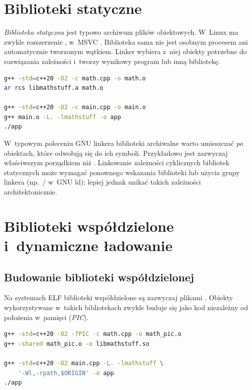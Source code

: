 \section{Biblioteki statyczne}
\label{sec:cpp17-static-libraries}

\emph{Biblioteka statyczna} jest typowo archiwum plików obiektowych.
W~Linux ma zwykle rozszerzenie , w~MSVC .
Biblioteka sama nie jest osobnym procesem ani automatycznie tworzonym
wątkiem. Linker wybiera z~niej obiekty potrzebne do rozwiązania
zależności i~tworzy wynikowy program lub inną bibliotekę.

\begin{lstlisting}[language=bash,caption={Budowanie i uzycie biblioteki statycznej (Linux/GCC).}]
g++ -std=c++20 -O2 -c math.cpp -o math.o
ar rcs libmathstuff.a math.o

g++ -std=c++20 -O2 -c main.cpp -o main.o
g++ main.o -L. -lmathstuff -o app
./app
\end{lstlisting}

W~typowym poleceniu GNU linkera biblioteki archiwalne warto umieszczać
\emph{po} obiektach, które odwołują się do ich symboli. Przykładowo
 jest zazwyczaj właściwszym porządkiem
niż . Linkowanie zależności cyklicznych
bibliotek statycznych może wymagać ponownego wskazania biblioteki
lub użycia grupy linkera (np.~/
w~GNU ld); lepiej jednak unikać takich zależności architektonicznie.


\section{Biblioteki współdzielone i~dynamiczne ładowanie}
\label{sec:cpp17-shared-libraries}

\subsection{Budowanie biblioteki współdzielonej}

Na systemach ELF biblioteki współdzielone są zazwyczaj plikami
. Obiekty wykorzystywane w~takich bibliotekach zwykle
buduje się jako kod niezależny od położenia w~pamięci (\emph{PIC}).

\begin{lstlisting}[language=bash,caption={Biblioteka .so oraz program klienta (Linux/GCC).}]
g++ -std=c++20 -O2 -fPIC -c math.cpp -o math_pic.o
g++ -shared math_pic.o -o libmathstuff.so

g++ -std=c++20 -O2 main.cpp -L. -lmathstuff \
    '-Wl,-rpath,$ORIGIN' -o app
./app
\end{lstlisting}

